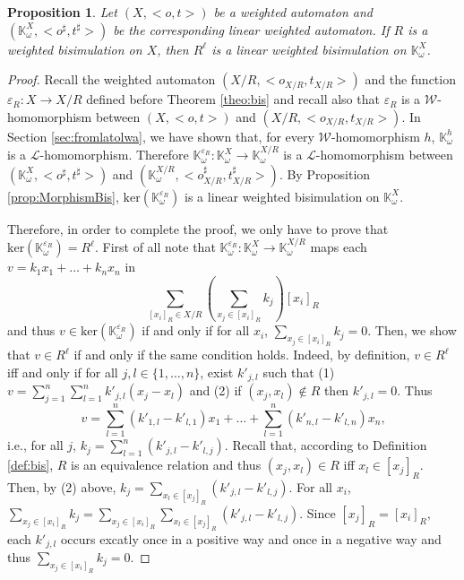 \documentclass[3p]{elsarticle}
\newcommand{\fW}{\mathcal{W}}    %
\newcommand{\fL}{\mathcal{L}}    %
\newcommand{\K}{\mathbb{K}}            %
\newcommand{\kernel}{\mathrm{ker}} %
\newtheorem{proposition}{Proposition}
\begin{document}
\begin{proposition}
Let $(X, <o,t>)$ be a weighted automaton and $(\K^X_{\omega}, <o^{\sharp},t^{\sharp}>)$ be the corresponding linear weighted automaton.
If $R$ is a weighted bisimulation on $X$, then $R^\ell$ is a linear weighted bisimulation on $\K^X_{\omega}$.
\end{proposition}
\begin{proof}
Recall the weighted automaton $(X/R, <o_{X/R},t_{X/R}>)$ and the function
$\varepsilon_R\colon  X \to X/R$ defined before Theorem \ref{theo:bis} and recall also that $\varepsilon_R$ is a
$\fW$-homomorphism between $(X, <o,t>)$ and $(X/R, <o_{X/R},t_{X/R}>)$.
In Section \ref{sec:fromlatolwa}, we have shown that, for every $\fW$-homomorphism $h$, $\K^{h}_{\omega}$ is a $\fL$-homomorphism.
Therefore $\K^{\varepsilon_R}_{\omega}\colon \K^X_{\omega} \to \K^{X/R}_{\omega} $ is a $\fL$-homomorphism between $(\K^X_{\omega}, <o^{\sharp},t^{\sharp}>)$ and
$(\K^{X/R}_{\omega}, <o_{X/R}^{\sharp},t_{X/R}^{\sharp}>)$.
By Proposition \ref{prop:MorphismBis}, $\kernel(\K^{\varepsilon_R}_{\omega})$ is a linear weighted bisimulation on $\K^X_{\omega}$.

Therefore, in order to complete the proof, we only have to prove that $\kernel(\K^{\varepsilon_R}_{\omega}) = R^{\ell}$.
First of all note that $\K^{\varepsilon_R}_{\omega} \colon \K^X_{\omega} \to \K^{X/R}_{\omega}$ maps each $v=k_1x_1 + \dots + k_nx_n$ in
$$\sum_{[x_i]_R \in X/R} \left( \sum_{x_j \in [x_i]_R} k_j \right) [x_i]_R$$
and thus $v\in \kernel(\K^{\varepsilon_R}_{\omega})$ if and only if for all $x_i$, $\sum_{x_j \in [x_i]_R} k_j=0$.
Then, we show that $v\in R^{\ell}$ if and only if the same condition holds. Indeed, by definition, $v\in R^{\ell}$ iff and only if for all
$j,l \in \{1, \dots, n\}$, exist $k'_{j,l}$ such that (1) $v=\sum_{j=1}^n\sum_{l=1}^n k'_{j,l} (x_j-x_l)$ and (2) if $(x_j,x_l)\notin R$ then
$k'_{j,l}=0$. Thus $$v= \sum_{l=1}^n (k'_{1,l} - k'_{l,1}) x_1 + \dots + \sum_{l=1}^n (k'_{n,l} - k'_{l,n}) x_n \text{,}$$
i.e., for all $j$, $k_j=\sum_{l=1}^n (k'_{j,l} - k'_{l,j})$. Recall that, according to Definition \ref{def:bis}, $R$ is an equivalence relation
and thus $(x_j,x_l)\in R$ iff $x_l \in [x_j]_R$. Then, by (2) above, $k_j=\sum_{x_l\in[x_j]_R} (k'_{j,l} - k'_{l,j})$.
%
For all $x_i$, $\sum_{x_j \in [x_i]_R} k_j =
\sum_{x_j\in [x_i]_R}\sum_{x_l \in [x_j]_R} (k'_{j,l} - k'_{l,j})$. Since $[x_j]_R=[x_i]_R$, each $k'_{j,l}$
occurs excatly once in a positive way and once in a negative way and thus $\sum_{x_j \in [x_i]_R} k_j =0$.
\end{proof}
\end{document}
